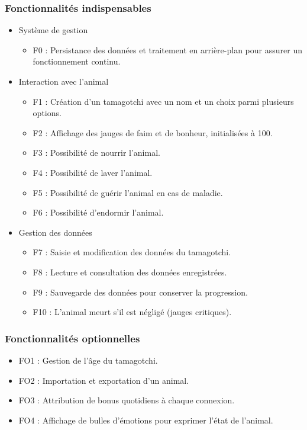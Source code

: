 \documentclass{cahier_des_charges}
\begin{document}
\subsubsection{Fonctionnalités indispensables}
\begin{itemize}[label=\textbullet]
\item Système de gestion
\begin{itemize}[label=\textendash]
\item F0 : Persistance des données et traitement en arrière-plan pour assurer un fonctionnement continu.
\end{itemize}
\item Interaction avec l’animal
\begin{itemize}[label=\textendash]
\item F1 : Création d’un tamagotchi avec un nom et un choix parmi plusieurs options.

\item F2 : Affichage des jauges de faim et de bonheur, initialisées à 100.

\item F3 : Possibilité de nourrir l’animal.

\item F4 : Possibilité de laver l’animal.

\item F5 : Possibilité de guérir l’animal en cas de maladie.

\item F6 : Possibilité d’endormir l’animal.
\end{itemize}
\item Gestion des données
\begin{itemize}[label=\textendash]
\item F7 : Saisie et modification des données du tamagotchi.

\item F8 : Lecture et consultation des données enregistrées.

\item F9 : Sauvegarde des données pour conserver la progression.

\item F10 : L’animal meurt s’il est négligé (jauges critiques).
\end{itemize}
\end{itemize}
\subsubsection{Fonctionnalités optionnelles}
\begin{itemize}[label=\textendash]
\item FO1 : Gestion de l’âge du tamagotchi.

\item FO2 : Importation et exportation d’un animal.

\item FO3 : Attribution de bonus quotidiens à chaque connexion.

\item FO4 : Affichage de bulles d’émotions pour exprimer l’état de l’animal.
\end{itemize}
\end{document}
